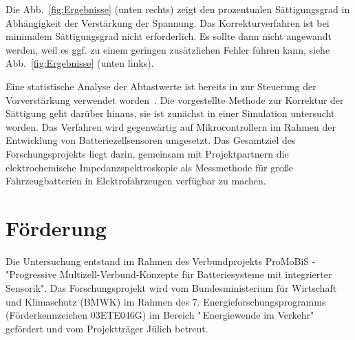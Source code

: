 \smallskip
Die Abb.~\ref{fig:Ergebnisse} (unten rechts) zeigt den prozentualen Sättigungsgrad in Abhängigkeit der Verstärkung der Spannung. Das Korrekturverfahren ist bei minimalem Sättigungsgrad nicht erforderlich. Es sollte dann nicht angewandt werden, weil es ggf. zu einem geringen zusätzlichen Fehler führen kann, siehe Abb.~\ref{fig:Ergebnisse} (unten links). 

Eine statistische Analyse der Abtastwerte ist bereits in zur Steuerung der Vorverstärkung verwendet worden~\cite{Frahm-2023}. Die vorgestellte Methode zur Korrektur der Sättigung geht darüber hinaus, sie ist zunächst in einer Simulation untersucht worden. Das Verfahren wird gegenwärtig auf Mikrocontrollern im Rahmen der Entwicklung von Batteriezellsensoren umgesetzt. Das Gesamtziel des Forschungsprojekts liegt darin, gemeinsam mit Projektpartnern die elektrochemische Impedanzspektroskopie als Messmethode für große Fahrzeugbatterien in Elektrofahrzeugen verfügbar zu machen.

\section*{Förderung}
Die Untersuchung entstand im Rahmen des Verbundprojekts ProMoBiS - "Progressive Multizell-Verbund-Konzepte für Batteriesysteme mit integrierter Sensorik". Das Forschungsprojekt wird vom Bundesministerium für Wirtschaft und Klimaschutz (BMWK) im Rahmen des 7. Energieforschungsprogramms (Förderkennzeichen 03ETE046G) im Bereich "\,Energiewende im Verkehr"\,gefördert und vom Projektträger Jülich betreut.
   
